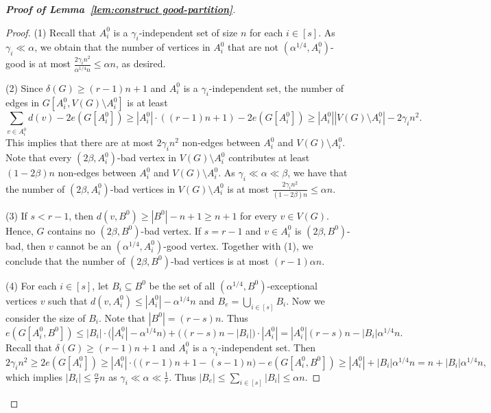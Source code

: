 \documentclass[11pt, a4paper]{article}
\theoremstyle{definition}
\newcommand{\<}{\subseteq}
\begin{document}
\begin{proof}[{\bf Proof of Lemma~\ref{lem:construct good-partition}}]
\begin{proof}
(1) Recall that $A_i^0$ is a $\gamma_i$-independent set of size $n$ for each $i\in [s]$. As $\gamma_i\ll \alpha$, we obtain that the number of vertices in $A_i^0$ that are not $(\alpha^{1/4},A_i^0)$-good is at most 
$
\frac{2\gamma_i n^2}{\alpha^{1/4}n}\leq \alpha n$,
as desired.\medskip

(2) Since {$\delta(G)\geq (r-1)n+1$} and $A_i^0$ is a $\gamma_i$-independent set, the number of edges in $G[A_i^0,V(G)\setminus A_i^0]$ is at least
$$\underset{v\in A_i^0}{\sum}d(v)-2e(G[A_i^0])\geq 
|A_i^0| \cdot ((r-1)n+1)-2 e(G[A_i^0]) \ge |A_i^0||V(G)\setminus A_i^0|-2\gamma_i n^2.
$$
This implies that there are at most $2\gamma_i n^2$ non-edges between $A_i^0$ and $V(G)\setminus A_i^0$.
Note that every $(2\beta,A_i^0)$-bad vertex in $V(G)\setminus A_i^0$ contributes at least $(1-2\beta) n$ non-edges between $A_i^0$ and $V(G)\setminus A_i^0$.
As $\gamma_i \ll \alpha \ll \beta$,  we have that the number of $(2\beta,A_i^0)$-bad vertices in $V(G)\setminus A_i^0$ is at most 
$\frac{2\gamma_i n^2}{(1-2\beta) n}\le{\alpha}n$. \medskip


(3) If $s< r-1$, then $d(v,B^0)\ge |B^0|-n+1\ge n+1$ for every $v\in V(G)$. Hence, $G$ contains no $(2\beta,B^0)$-bad vertex. If $s=r-1$ and $v\in A_i^0$ is $(2\beta,B^0)$-bad, then $v$ cannot be an $(\alpha^{1/4},A_i^0)$-good vertex. Together with (1), we conclude that the number of $(2\beta,B^0)$-bad vertices is at most $(r-1){\alpha} n.$\medskip


(4) For each $i\in [s]$, let $B_i\<B^0$ be the set of all $(\alpha^{1/4},B^0)$-exceptional vertices $v$ such that $d(v,A_i^0)\le |A_i^0|-\alpha^{1/4}n$ and $B_e=\bigcup_{i\in [s]}B_i$. Now we consider the size of $B_i$.
Note that $|B^0|=(r-s)n$.
Thus 
\[
e(G[A_i^0,B^0])\le |B_i|\cdot \big(|A_i^0|-{\alpha^{1/4} n}\big)+\big((r-s)n-|B_i|\big)\cdot|A_i^0|=|A_i^0|(r-s)n-|B_i|\alpha^{1/4}n.
\]
Recall that $\delta(G)\geq (r-1)n+1$ and $A_i^0$ is a $\gamma_i$-independent set. Then %
\[
2\gamma_in^2\geq 2e(G[A_i^0])\ge|A_i^0|\cdot\big((r-1)n+1-(s-1)n\big)-e(G[A_i^0,B^0])\ge |A_i^0|+|B_i|\alpha^{1/4}n=n+|B_i|\alpha^{1/4}n,
\]
which implies $|B_i|\leq \frac{\alpha}{r} n$ as $\gamma_i\ll \alpha\ll \frac{1}{r}$. Thus 
$
|B_e|\leq \sum_{i\in [s]}|B_i|\le \alpha n.$ 
\end{proof}


\end{proof}
\end{document}

